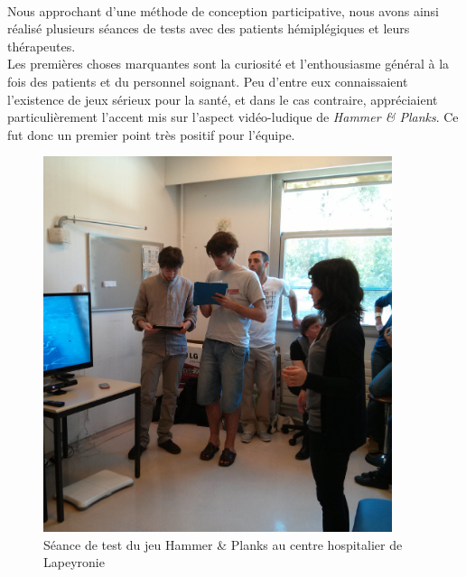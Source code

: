 \paragraph{} Nous approchant d'une méthode de conception participative, nous avons ainsi réalisé plusieurs séances de tests avec des patients hémiplégiques et leurs thérapeutes. \\
Les premières choses marquantes sont la curiosité et l'enthousiasme général à la fois des patients et du personnel soignant. Peu d'entre eux connaissaient l'existence de jeux sérieux pour la santé, et dans le cas contraire, appréciaient particulièrement l'accent mis sur l'aspect vidéo-ludique de \emph{Hammer \& Planks}. Ce fut donc un premier point très positif pour l'équipe.
\begin{figure}[hbt]
	\centering
	\includegraphics[height=11cm]{images/test_lapeyronie.png}
	\caption{Séance de test du jeu Hammer \& Planks au centre hospitalier de Lapeyronie}
	\label{test_lapeyronie}
\end{figure}
